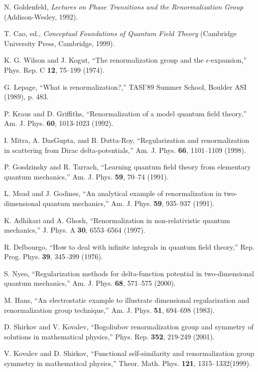 \documentclass[floatfix,twocolumn,preprintnumbers,amsmath,amssymb,prb]{revtex4}
\begin{document}
{{\begin{thebibliography}{10}
 N. Goldenfeld,
\emph{Lectures on Phase Transitions and the Renormalization Group}
(Addison-Wesley, 1992).

T. Cao, ed.,
\emph{Conceptual Foundations of Quantum Field Theory} (Cambridge
University Press, Cambridge, 1999).

 K. G. Wilson and J. Kogut, ``The
renormalization group and the $\epsilon$-expansion,'' Phys. Rep. C
\textbf{12}, 75--199 (1974).

G. Lepage, ``What is renormalization?,'' TASI'89
Summer School, Boulder ASI (1989), p. 483.

P. Kraus and D. Griffiths, ``Renormalization of a
model quantum field theory,'' Am. J. Phys. \textbf{60}, 1013-1023
(1992).

 I. Mitra, A. DasGupta, and B. Dutta-Roy,
``Regularization and renormalization in scattering from Dirac
delta-potentials,'' Am. J. Phys. \textbf{66}, 1101--1109 (1998).

P. Gosdzinsky and R. Tarrach, ``Learning
quantum field theory from elementary quantum mechanics,'' Am. J.
Phys. \textbf{59}, 70--74 (1991).

L. Mead and J. Godines, ``An analytical example of
renormalization in two-dimensional quantum mechanics,'' Am. J.
Phys. \textbf{59}, 935--937 (1991).

 K. Adhikari and A. Ghosh, ``Renormalization
in non-relativistic quantum mechanics,'' J. Phys. A \textbf{30},
6553--6564 (1997).

 R. Delbourgo, ``How to deal with infinite
integrals in quantum field theory,'' Rep. Prog. Phys. \textbf{39},
345--399 (1976).

 S. Nyeo, ``Regularization methods for
delta-function potential in two-dimensional quantum mechanics,''
Am. J. Phys. \textbf{68}, 571--575 (2000).

 M. Hans, ``An electrostatic example to illustrate
dimensional regularization and renormalization group technique,''
Am. J. Phys. \textbf{51}, 694--698
(1983).

 D. Shirkov and V. Kovalev, ``Bogoliubov
renormalization group and symmetry of solutions in mathematical
physics,'' Phys. Rep.
\textbf{352}, 219-249 (2001).

 V. Kovalev and D. Shirkov, ``Functional
self-similarity and renormalization group symmetry in mathematical
physics,'' Theor. Math. Phys. \textbf{121}, 1315--1332(1999).


\end{thebibliography}}}
\end{document}
